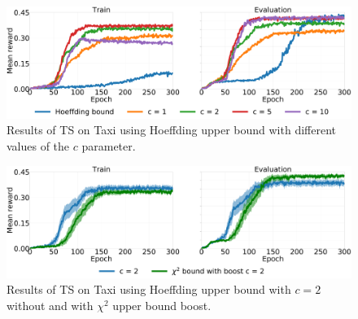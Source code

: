 \begin{figure}[t]
\begin{minipage}{\textwidth}
\begin{center}
  \includegraphics[scale=.05]{img/cs.pdf}
\end{center}
\end{minipage}
\caption[Taxi with different upper bounds results - 2]{Results of TS on Taxi using Hoeffding upper bound with different values of the $c$ parameter.}\label{F:cs}
\end{figure}
\begin{figure}[t]
\begin{minipage}{\textwidth}
\begin{center}
  \includegraphics[scale=.05]{img/chics.pdf}
\end{center}
\end{minipage}
\caption[Taxi with different upper bounds results - 3]{Results of TS on Taxi using Hoeffding upper bound with $c=2$ without and with $\chi^2$ upper bound boost.}\label{F:chics}
\end{figure}
